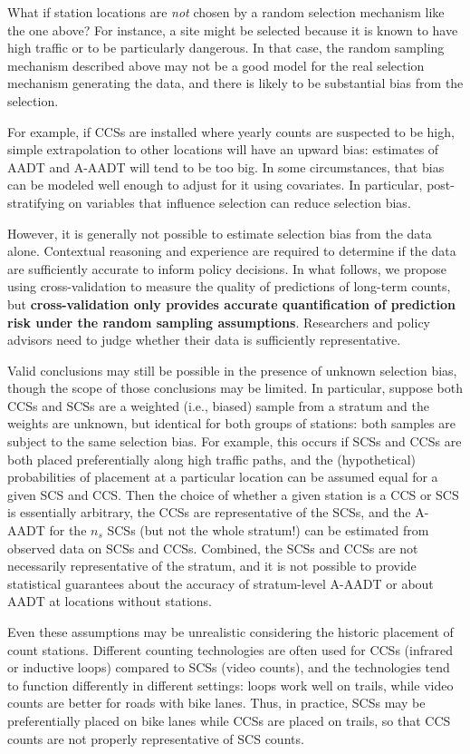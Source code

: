 \documentclass[11pt]{article}
\begin{document}
What if station locations are \emph{not} chosen by a random selection
mechanism like the one above? For instance, a site might be selected
because it is known to have high traffic or to be particularly
dangerous. In that case, the random sampling mechanism described above
may not be a good model for the real selection mechanism generating the
data, and there is likely to be substantial bias from the selection.

For example, if CCSs are installed where yearly counts are suspected to
be high, simple extrapolation to other locations will have an upward
bias: estimates of AADT and A-AADT will tend to be too big. In some
circumstances, that bias can be modeled well enough to adjust for it
using covariates. In particular, post-stratifying on variables that
influence selection can reduce selection bias.

However, it is generally not possible to estimate selection bias from
the data alone. Contextual reasoning and experience are required to
determine if the data are sufficiently accurate to inform policy
decisions. In what follows, we propose using cross-validation to measure
the quality of predictions of long-term counts, but
\textbf{cross-validation only provides accurate quantification of
prediction risk under the random sampling assumptions}. Researchers and
policy advisors need to judge whether their data is sufficiently
representative.

Valid conclusions may still be possible in the presence of unknown
selection bias, though the scope of those conclusions may be limited. In
particular, suppose both CCSs and SCSs are a weighted (i.e., biased)
sample from a stratum and the weights are unknown, but identical for
both groups of stations: both samples are subject to the same selection
bias. For example, this occurs if SCSs and CCSs are both placed
preferentially along high traffic paths, and the (hypothetical)
probabilities of placement at a particular location can be assumed equal
for a given SCS and CCS. Then the choice of whether a given station is a
CCS or SCS is essentially arbitrary, the CCSs are representative of the
SCSs, and the A-AADT for the \(n_s\) SCSs (but not the whole stratum!)
can be estimated from observed data on SCSs and CCSs. Combined, the SCSs
and CCSs are not necessarily representative of the stratum, and it is
not possible to provide statistical guarantees about the accuracy of
stratum-level A-AADT or about AADT at locations without stations.

Even these assumptions may be unrealistic considering the historic
placement of count stations. Different counting technologies are often
used for CCSs (infrared or inductive loops) compared to SCSs (video
counts), and the technologies tend to function differently in different
settings: loops work well on trails, while video counts are better for
roads with bike lanes. Thus, in practice, SCSs may be preferentially
placed on bike lanes while CCSs are placed on trails, so that CCS counts
are not properly representative of SCS counts.
\end{document}
